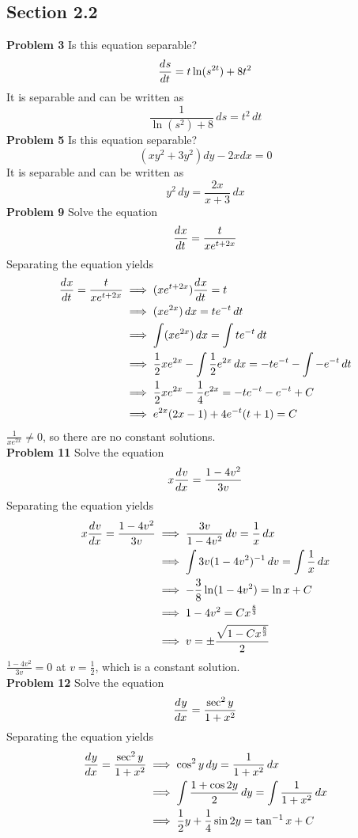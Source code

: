 \subsection*{Section 2.2}
\textbf{Problem 3}
Is this equation separable? 
\[
    \frac{d^{} s}{d t^{}} = t\ln(s^{2t}) + 8t^2
\]
\solution
It is separable and can be written as 
\[
    \frac{1}{\ln(s^2)+8}\,ds = t^2 \,dt
\]
\textbf{Problem 5}
Is this equation separable?
\[
    (xy^2 + 3y^2)dy - 2xdx = 0
\]
\solution 
It is separable and can be written as 
\[
    y^2 \,dy = \frac{2x}{x+3} \,dx
\]
\textbf{Problem 9}
Solve the equation
\[
    \frac{d^{} x}{d t^{}} = \frac{t}{xe^{t+2x}}
\]
\solution 
Separating the equation yields 
\begin{align*}
    \frac{d^{} x}{d t^{}} = \frac{t}{xe^{t+2x}}
    &\implies (xe^{t+2x})\frac{d^{} x}{d t^{}} = t \\
    &\implies (xe^{2x}) \,dx = te^{-t} \,dt \\
    &\implies \int (xe^{2x}) \,dx = \int te^{-t} \,dt \\
    &\implies \frac{1}{2}xe^{2x} - \int \frac{1}{2}e^{2x} \,dx =
              -te^{-t} - \int -e^{-t} \,dt \\
    &\implies \frac{1}{2}xe^{2x} - \frac{1}{4}e^{2x} = -te^{-t} - e^{-t} + C \\
    &\implies e^{2x}(2x-1) + 4e^{-t}(t+1) = C
\end{align*}
$\frac{1}{xe^{2x}} \neq 0$, so there are no constant solutions. \\
\textbf{Problem 11}
Solve the equation 
\[
    x\frac{d^{} v}{d x^{}} = \frac{1-4v^2}{3v}
\]
\solution 
Separating the equation yields 
\begin{align*}
    x\frac{d^{} v}{d x^{}} = \frac{1-4v^2}{3v}
    &\implies \frac{3v}{1-4v^2} \,dv = \frac{1}{x} \,dx \\
    &\implies \int 3v(1-4v^2)^{-1} \,dv = \int \frac{1}{x} \,dx \\
    &\implies -\frac{3}{8}\ln(1-4v^2) = \ln x + C \\
    &\implies 1-4v^2 = Cx^{\frac{8}{3}} \\
    &\implies v = \pm \frac{\sqrt{1-Cx^{\frac{8}{3}}}}{2}
\end{align*}
$\frac{1-4v^2}{3v} = 0$ at $v=\frac{1}{2}$, which is a constant solution. \\
\textbf{Problem 12}
Solve the equation 
\[
    \frac{d^{} y}{d x^{}} = \frac{\sec^2 y}{1+x^2}
\]
\solution 
Separating the equation yields 
\begin{align*}
    \frac{d^{} y}{d x^{}} = \frac{\sec^2 y}{1+x^2}
    &\implies \cos^2 y \,dy = \frac{1}{1+x^2} \,dx \\
    &\implies \int \frac{1 + \cos 2y}{2} \,dy = \int \frac{1}{1+x^2} \,dx \\
    &\implies  \frac{1}{2}y + \frac{1}{4}\sin 2y = \tan^{-1} x  + C\\ 
\end{align*}
